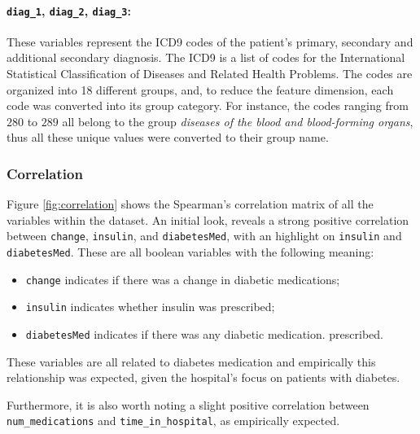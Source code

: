 \documentclass[a4paper,11pt]{article}
\newcommand{\timeInHospital}{\texttt{time\_in\_hospital}\xspace}
\newcommand{\numMedications}{\texttt{num\_medications}\xspace}
\newcommand{\diagOne}{\texttt{diag\_1}\xspace}
\newcommand{\diagTwo}{\texttt{diag\_2}\xspace}
\newcommand{\diagThree}{\texttt{diag\_3}\xspace}
\newcommand{\insulin}{\texttt{insulin}\xspace}
\newcommand{\change}{\texttt{change}\xspace}
\newcommand{\diabetesMed}{\texttt{diabetesMed}\xspace}
\begin{document}
\paragraph{\diagOne, \diagTwo, \diagThree:}
These variables represent the ICD9 codes of the patient's primary, secondary and additional secondary diagnosis. The ICD9 is a list of codes for the International Statistical Classification of Diseases and Related Health Problems. The codes are organized into \SI{18}{} different groups, and, to reduce the feature dimension, each code was converted into its group category. For instance, the codes ranging from $280$ to $289$ all belong to the group \textit{diseases of the blood and blood-forming organs}, thus all these unique values were converted to their group name.

\subsubsection{Correlation}

Figure \ref{fig:correlation} shows the Spearman's correlation matrix of all the variables within the dataset. An initial look, reveals a strong positive correlation between \change, \insulin, and \diabetesMed, with an highlight on \insulin and \diabetesMed. These are all boolean variables with the following meaning:

\begin{itemize}
    \setlength\itemsep{0em} %
    \item \change indicates if there was a change in diabetic medications;
    \item \insulin indicates whether insulin was prescribed;
    \item \diabetesMed indicates if there was any diabetic medication. prescribed.
\end{itemize}

These variables are all related to diabetes medication and empirically this relationship was expected, given the hospital's focus on patients with diabetes.

Furthermore, it is also worth noting a slight positive correlation between \numMedications and \timeInHospital, as empirically expected.
\end{document}
